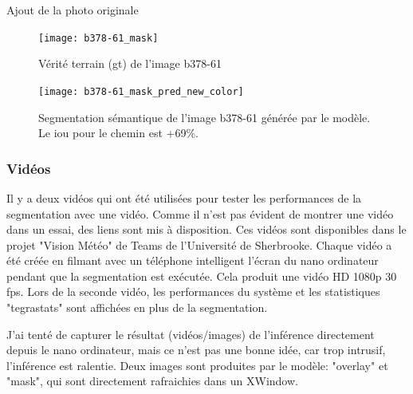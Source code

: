 \par {\color{red}Ajout de la photo originale }
\begin{figure}[H]
   \centering
   \texttt{[image: b378-61\_mask]}
   \caption{Vérité terrain (\acrshort{gt}) de l'image b378-61}
   \label{fig:b378-61_mask}
\end{figure}
\begin{figure}[H]
   \centering
   \texttt{[image: b378-61\_mask\_pred\_new\_color]}
   \caption[Segmentation sémantique de l'image b378-61 générée par le modèle]{Segmentation sémantique de l'image b378-61 générée par le modèle. Le \acrshort{iou} pour le chemin est +69\%.}
   \label{fig:b378-61_mask_pred_new_color}
\end{figure}
\subsubsection{Vidéos}
\par Il y a deux vidéos qui ont été utilisées pour tester les performances de la segmentation avec une vidéo. Comme il n'est pas évident de montrer une vidéo dans un essai, des liens sont mis à disposition. Ces vidéos sont disponibles dans le projet "Vision Météo" de Teams de l'Université de Sherbrooke. Chaque vidéo a été créée en filmant avec un téléphone intelligent l'écran du nano ordinateur pendant que la segmentation est exécutée. Cela produit une vidéo HD 1080p 30 \acrshort{fps}. Lors de la seconde vidéo, les performances du système et les statistiques "tegrastats" sont affichées en plus de la segmentation.
\par J'ai tenté de capturer le résultat (vidéos/images) de l'inférence directement depuis le nano ordinateur, mais ce n'est pas une bonne idée, car trop intrusif, l'inférence est ralentie. Deux images sont produites par le modèle: "overlay" et "mask", qui sont directement rafraichies dans un XWindow. 
